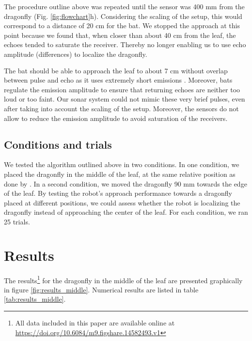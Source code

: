 \documentclass[letterpaper]{article}
\newcommand{\flowchart}[1]{(Fig. \ref{fig:flowchart}#1)}
\begin{document}
The procedure outline above was repeated until the sensor was 400 mm from the dragonfly \flowchart{h}. Considering the scaling of the setup, this would correspond to a distance of 20 cm for the bat. We stopped the approach at this point because we found that, when closer than about 40 cm from the leaf, the echoes tended to saturate the receiver. Thereby no longer enabling us to use echo amplitude (differences) to localize the dragonfly. 

The bat should be able to approach the leaf to about 7 cm without overlap between pulse and echo as it uses extremely short emissions \citep[0.2 ms,][]{Geipel2013}. Moreover, bats regulate the emission amplitude to ensure that returning echoes are neither too loud or too faint. Our sonar system could not mimic these very brief pulses, even after taking into account the scaling of the setup. Moreover, the sensors do not allow to reduce the emission amplitude to avoid saturation of the receivers.

\subsection{Conditions and trials}

We tested the algorithm outlined above in two conditions. In one condition, we placed the dragonfly in the middle of the leaf, at the same relative position as done by \citet{Geipel2019}. In a second condition, we moved the dragonfly 90 mm towards the edge of the leaf. By testing the robot's approach performance towards a dragonfly placed at different positions, we could assess whether the robot is localizing the dragonfly instead of approaching the center of the leaf. For each condition, we ran 25 trials.

\section{Results}

The results\footnote{All data included in this paper are available online at \url{https://doi.org/10.6084/m9.figshare.14582493.v1}} for the dragonfly in the middle of the leaf are presented graphically in figure \ref{fig:results_middle}. Numerical results are listed in table \ref{tab:results_middle}. 
\end{document}
